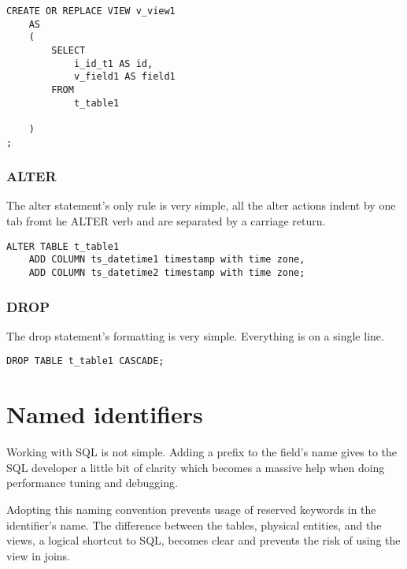 \begin{lstlisting}[style=pgsql]
CREATE OR REPLACE VIEW v_view1
	AS
	(
		SELECT
			i_id_t1 AS id,
			v_field1 AS field1
		FROM
			t_table1
		
	)
;

\end{lstlisting}


\subsubsection{ALTER}
The alter statement's only rule is very simple, all the alter actions indent by one tab fromt he ALTER verb and are 
separated by a carriage return.

\begin{lstlisting}[style=pgsql]
ALTER TABLE t_table1
	ADD COLUMN ts_datetime1 timestamp with time zone,
	ADD COLUMN ts_datetime2 timestamp with time zone;
\end{lstlisting}


\subsubsection{DROP}
The drop statement's formatting is very simple. Everything is on a single line.

\begin{lstlisting}[style=pgsql]
DROP TABLE t_table1 CASCADE;
\end{lstlisting}


\section{Named identifiers}
Working with SQL is not simple.  Adding a prefix to the field's name gives to the SQL developer a little bit of 
clarity which becomes a massive help when doing performance tuning and debugging.\newline 

Adopting this naming convention prevents usage of reserved keywords in the identifier's name. The difference between 
the tables, physical entities, and the views, a logical shortcut to SQL, becomes clear and prevents the risk of 
using the view in joins. \newline



